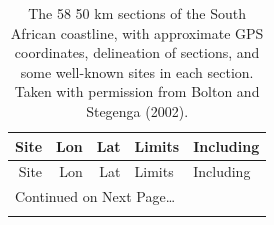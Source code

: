 \documentclass[10pt,a4,]{article}
\begin{document}
\begin{tiny}
\begin{center}
\setlength\tabcolsep{4pt}
\begin{longtable}{|r|r|r|l|p{6cm}|}
\caption{The 58 \texttimes{} 50 km sections of the South African coastline, with approximate GPS coordinates, delineation of sections, and some well-known sites in each section. Taken with permission from Bolton and Stegenga (2002).} \\

\toprule
Site & Lon & Lat & Limits & Including \\
\midrule
\endfirsthead

\toprule
Site & Lon & Lat & Limits & Including \\
\midrule
\endhead

\midrule
\multicolumn{5}{l}{{Continued on Next Page\ldots}} \\
\endfoot

\bottomrule
\endlastfoot


\end{longtable}
\end{center}
\end{tiny}
\end{document}
